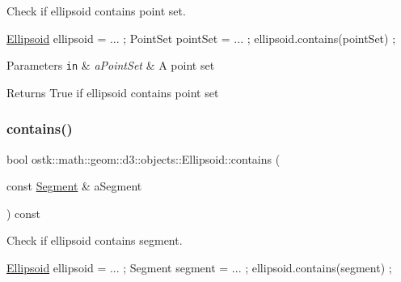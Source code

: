 Check if ellipsoid contains point set. 


\begin{DoxyCode}
\hyperlink{classostk_1_1math_1_1geom_1_1d3_1_1objects_1_1_ellipsoid_a106c71abf9503f3d06b2613c1c7e9d65}{Ellipsoid} ellipsoid = ... ;
PointSet pointSet = ... ;
ellipsoid.contains(pointSet) ;
\end{DoxyCode}



\begin{DoxyParams}[1]{Parameters}
\mbox{\tt in}  & {\em a\+Point\+Set} & A point set \\
\hline
\end{DoxyParams}
\begin{DoxyReturn}{Returns}
True if ellipsoid contains point set 
\end{DoxyReturn}
\mbox{\label{classostk_1_1math_1_1geom_1_1d3_1_1objects_1_1_ellipsoid_afcb41440d899c60766cdc7e9c838c55d}} 
\subsubsection{\texorpdfstring{contains()}{contains()}\hspace{0.1cm}{\footnotesize\ttfamily [3/3]}}
{\footnotesize\ttfamily bool ostk\+::math\+::geom\+::d3\+::objects\+::\+Ellipsoid\+::contains (\begin{DoxyParamCaption}\item[{const \hyperlink{classostk_1_1math_1_1geom_1_1d3_1_1objects_1_1_segment}{Segment} \&}]{a\+Segment }\end{DoxyParamCaption}) const}



Check if ellipsoid contains segment. 


\begin{DoxyCode}
\hyperlink{classostk_1_1math_1_1geom_1_1d3_1_1objects_1_1_ellipsoid_a106c71abf9503f3d06b2613c1c7e9d65}{Ellipsoid} ellipsoid = ... ;
Segment segment = ... ;
ellipsoid.contains(segment) ;
\end{DoxyCode}



